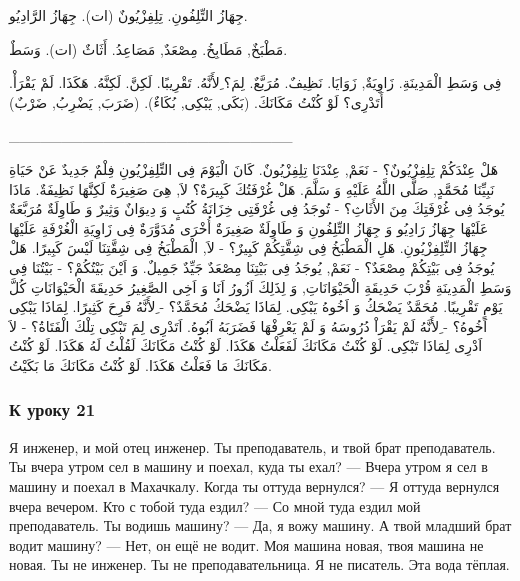 \documentclass[a5paper]{article}
\begin{document}
جِهَازُ التِّلِفُونِ. تِلِفِزْيُونٌ (ات). جِهَازُ الرَّادِيُو. 

مَطْبَخٌ, مَطَابِخُ. مِصْعَدٌ, مَصَاعِدُ. أَثَاثٌ (ات). وَسَطٌ. 

فِى وَسَطِ الْمَدِينَةِ. زَاوِيَةٌ, زَوَايَا. نَظِيفٌ. مُرَبَّعٌ. لِمَ؟ ِلأَنَّهُ. تَقْرِيبًا. لَكِنَّ. لَكِنَّهُ. هَكَذَا. لَمْ يَقْرَأْ. أَتَدْرِى؟ لَوْ كُنْتُ مَكَانَكَ. (بَكَى, يَبْكِى, بُكَاءٌ). (ضَرَبَ, يَضْرِبُ, ضَرْبٌ)

\_\_\_\_\_\_\_\_\_\_\_\_\_\_\_\_\_\_\_\_\_\_\_\_\_\_\_

هَلْ عِنْدَكُمْ تِلِفِزْيُونٌ؟ - نَعَمْ, عِنْدَنَا تِلِفِزْيُونٌ. كَانَ الْيَوْمَ فِى التِّلِفِزْيُونِ فِلْمٌ جَدِيدٌ عَنْ حَيَاةِ نَبِيِّنَا مُحَمَّدٍ, صَلَّى اللَّهُ عَلَيْهِ وَ سَلَّمَ. هَلْ غُرْفَتُكَ كَبِيرَةٌ؟ لاَ, هِىَ صَغِيرَةٌ لَكِنَّهَا نَظِيفَةٌ. مَاذَا يُوجَدُ فِى غُرْفَتِكَ مِنَ الأَثَاثِ؟ - تُوجَدُ فِى غُرْفَتِى خِزَانَةُ كُتُبٍ وَ دِيوَانٌ وَثِيرٌ وَ طَاوِلَةٌ مُرَبَّعَةٌ عَلَيْهَا جِهَازُ رَادِيُو وَ جِهَازُ التِّلِفُونِ وَ طَاوِلَةٌ صَغِيرَةٌ أُخْرَى مُدَوَّرَةٌ فِى زَاوِيَةِ الْغُرْفَةِ عَلَيْهَا جِهَازُ التِّلِفِزْيُونِ. هَلِ الْمَطْبَخُ فِى شِقَّتِكُمْ كَبِيرٌ؟ - لاَ, الْمَطْبَخُ فِى شِقَّتِنَا لَيْسَ كَبِيرًا. هَلْ يُوجَدُ فِى بَيْتِكُمْ مِصْعَدٌ؟ - نَعَمْ, يُوجَدُ فِى بَيْتِنَا مِصْعَدٌ جَيِّدٌ جَمِيلٌ. وَ اَيْنَ بَيْتُكُمْ؟ - بَيْتُنَا فِى وَسَطِ الْمَدِينَةِ قُرْبَ حَدِيقَةِ الْحَيْوَانَاتِ, وَ لِذَلِكَ اَزُورُ اَنَا وَ اَخِى الصَّغِيرُ حَدِيقَةَ الْحَيْوَانَاتِ كُلَّ يَوْمٍ تَقْرِيبًا. مُحَمَّدٌ يَضْحَكُ وَ اَخُوهُ يَبْكِى. لِمَاذَا يَضْحَكُ مُحَمَّدٌ؟ - ِلأَنَّهُ فَرِحَ كَثِيرًا. لِمَاذَا يَبْكِى اَخُوهُ؟ - ِلأَنَّهُ لَمْ يَقْرَاْ دُرُوسَهُ وَ لَمْ يَعْرِفْهَا فَضَرَبَهُ اَبُوهُ. اَتَدْرِى لِمَ تَبْكِى تِلْكَ الْفَتَاةُ؟ - لاَ اَدْرِى لِمَاذَا تَبْكِى. لَوْ كُنْتُ مَكَانَكَ لَفَعَلْتُ هَكَذَا. لَوْ كُنْتُ مَكَانَكَ لَقُلْتُ لَهُ هَكَذَا. لَوْ كُنْتُ مَكَانَكَ مَا فَعَلْتُ هَكَذَا. لَوْ كُنْتُ مَكَانَكَ مَا بَكَيْتُ. 

\subsubsection{К уроку 21}
Я инженер, и мой отец инженер. Ты преподаватель, и твой брат преподаватель. Ты вчера утром сел в машину и поехал, куда ты ехал? — Вчера утром я сел в машину и поехал в Махачкалу. Когда ты оттуда вернулся? — Я оттуда вернулся вчера вечером. Кто с тобой туда ездил? — Со мной туда ездил мой преподаватель. Ты водишь машину? — Да, я вожу машину. А твой младший брат водит машину? — Нет, он ещё не водит. Моя машина новая, твоя машина не новая. Ты не инженер. Ты не преподавательница. Я не писатель. Эта вода тёплая.
\end{document}
